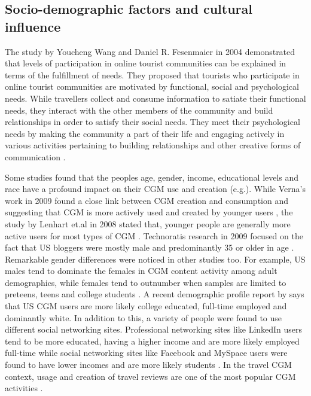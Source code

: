 \subsection{Socio-demographic factors and cultural influence}

 

The study by Youcheng Wang and Daniel R. Fesenmaier in 2004 demonstrated that levels of participation in online tourist communities can be explained in terms of the fulfillment of needs. They proposed that tourists who participate in online tourist communities are motivated by functional, social and psychological needs. While travellers collect and consume information to satiate their functional needs, they interact with the other members of the community and build relationships in order to satisfy their social needs. They meet their psychological needs by making the community a part of their life and engaging actively in various activities pertaining to building relationships and other creative forms of communication \cite{wang2002defining}.

Some studies found that the people\textquotesingle s age, gender, income, educational levels and race have a profound impact on their CGM use and creation (e.g.\cite{lenhart2008teens}\cite{verna2009user}). While Verna's work in 2009 found a close link between CGM creation and consumption and suggesting that CGM is more actively used and created by younger users \cite{verna2009user}, the study by Lenhart et.al in 2008 stated that, younger people are generally more active users for most types of CGM \cite{lenhart2008teens}.  Technorati\textquotesingle s research in 2009 focused on the fact that US bloggers were mostly male and predominantly 35 or older in age \cite{technorati2008}. Remarkable gender differences were noticed in other studies too. For example, US males tend to dominate the females in CGM content activity among adult demographics, while females tend to outnumber when samples are limited to preteens, teens and college students \cite{verna2009user}. A recent demographic profile report by \cite{eMarketer2009} says that US CGM users are more likely college educated, full-time employed and dominantly white. In addition to this, a variety of people were found to use different social networking sites. Professional networking sites like LinkedIn users tend to be more educated, having a higher income and are more likely employed full-time while social networking sites like Facebook and MySpace users were found to have lower incomes and are more likely students \cite{eMarketer2009}. In the travel CGM context, usage and creation of travel reviews are one of the most popular CGM activities \cite{gretzel2007online}.
 


